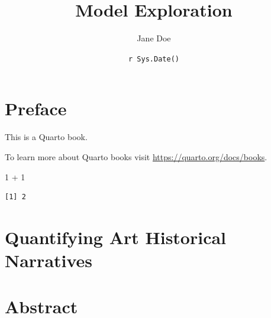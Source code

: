 \documentclass[
  letterpaper,
  DIV=11,
  numbers=noendperiod]{scrreprt}
\title{Model Exploration}
\author{Jane Doe}
\date{\texttt{r\ Sys.Date()}}
\newenvironment{Shaded}{\begin{snugshade}}{\end{snugshade}}
\newcommand{\DecValTok}[1]{\textcolor[rgb]{0.68,0.00,0.00}{#1}}
\newcommand{\SpecialCharTok}[1]{\textcolor[rgb]{0.37,0.37,0.37}{#1}}
\renewcommand*\contentsname{Table of contents}
\begin{document}
\maketitle

\renewcommand*\contentsname{Table of contents}
{
\hypersetup{linkcolor=}
\setcounter{tocdepth}{2}
\tableofcontents
}
\hypertarget{preface}{%
\chapter*{Preface}\label{preface}}

This is a Quarto book.

To learn more about Quarto books visit
\url{https://quarto.org/docs/books}.

\begin{Shaded}
\begin{Highlighting}[]
\DecValTok{1} \SpecialCharTok{+} \DecValTok{1}
\end{Highlighting}
\end{Shaded}

\begin{verbatim}
[1] 2
\end{verbatim}

\hypertarget{quantifying-art-historical-narratives}{%
\chapter{Quantifying Art Historical
Narratives}\label{quantifying-art-historical-narratives}}

\hypertarget{abstract}{%
\chapter{Abstract}\label{abstract}}
\end{document}
